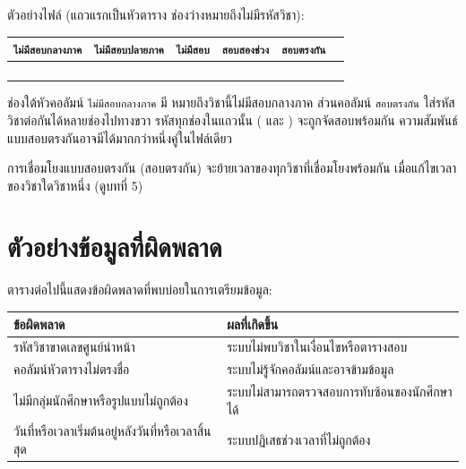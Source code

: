ตัวอย่างไฟล์  (แถวแรกเป็นหัวตาราง ช่องว่างหมายถึงไม่มีรหัสวิชา):

\begin{center}
\small
\begin{tabular}{L{2.45cm}L{2.45cm}L{1.8cm}L{2.15cm}L{2.15cm}L{2.2cm}}
\toprule
\texttt{ไม่มีสอบกลางภาค} & \texttt{ไม่มีสอบปลายภาค} & \texttt{ไม่มีสอบ} & \texttt{สอบสองช่วง} & \texttt{สอบตรงกัน} & \\
\midrule
{} & & & & & \\
 &  & & & & \\
 & & &  & & \\
 & & & &  &  \\
\bottomrule
\end{tabular}
\end{center}

\begin{expected}
ช่องใต้หัวคอลัมน์ \texttt{ไม่มีสอบกลางภาค} มี 
หมายถึงวิชานี้ไม่มีสอบกลางภาค ส่วนคอลัมน์ \texttt{สอบตรงกัน}
ใส่รหัสวิชาต่อกันได้หลายช่องไปทางขวา รหัสทุกช่องในแถวนั้น
( และ ) จะถูกจัดสอบพร้อมกัน
ความสัมพันธ์แบบสอบตรงกันอาจมีได้มากกว่าหนึ่งคู่ในไฟล์เดียว
\end{expected}

\begin{caution}
การเชื่อมโยงแบบสอบตรงกัน (สอบตรงกัน) จะย้ายเวลาของทุกวิชาที่เชื่อมโยงพร้อมกัน
เมื่อแก้ไขเวลาของวิชาใดวิชาหนึ่ง (ดูบทที่ 5)
\end{caution}

\section{ตัวอย่างข้อมูลที่ผิดพลาด}

ตารางต่อไปนี้แสดงข้อผิดพลาดที่พบบ่อยในการเตรียมข้อมูล:

\begin{longtable}{L{6cm}L{8.5cm}}
\toprule
\textbf{ข้อผิดพลาด} & \textbf{ผลที่เกิดขึ้น} \\
\midrule
รหัสวิชาขาดเลขศูนย์นำหน้า & ระบบไม่พบวิชาในเงื่อนไขหรือตารางสอบ \\
คอลัมน์หัวตารางไม่ตรงชื่อ & ระบบไม่รู้จักคอลัมน์และอาจข้ามข้อมูล \\
ไม่มีกลุ่มนักศึกษาหรือรูปแบบไม่ถูกต้อง & ระบบไม่สามารถตรวจสอบการทับซ้อนของนักศึกษาได้ \\
วันที่หรือเวลาเริ่มต้นอยู่หลังวันที่หรือเวลาสิ้นสุด & ระบบปฏิเสธช่วงเวลาที่ไม่ถูกต้อง \\
\bottomrule
\end{longtable}

